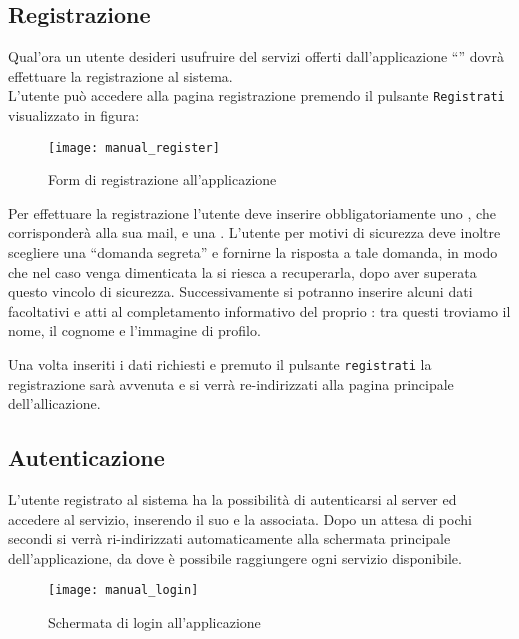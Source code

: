 \subsection{Registrazione}
Qual'ora un utente desideri usufruire del servizi offerti dall'applicazione ``\caName'' dovrà effettuare la registrazione al sistema.\\
L'utente può accedere alla pagina registrazione premendo il pulsante \texttt{Registrati} visualizzato in figura:

\begin{figure}[H]
  \texttt{[image: manual\_register]}
\caption{Form di registrazione all'applicazione}\label{fig:register}
\end{figure}


Per effettuare la registrazione l'utente deve inserire obbligatoriamente uno \underline{}, che corrisponderà alla sua mail, e una .
L'utente per motivi di sicurezza deve inoltre scegliere una ``domanda segreta'' e fornirne la risposta a tale domanda, in modo che nel caso venga dimenticata la  si riesca a recuperarla, dopo aver superata questo vincolo di sicurezza.
Successivamente si potranno inserire alcuni dati facoltativi e atti al completamento informativo del proprio : tra questi troviamo il nome, il cognome e l'immagine di profilo.

Una volta inseriti i dati richiesti e premuto il pulsante \texttt{registrati} la registrazione sarà avvenuta e si verrà re-indirizzati alla pagina principale dell'allicazione.

\subsection{Autenticazione}
L'utente registrato al sistema ha la possibilità di autenticarsi al server \caName{} ed accedere al servizio, inserendo il suo  e la  associata.
Dopo un attesa di pochi secondi si verrà ri-indirizzati automaticamente alla schermata principale dell'applicazione, da dove è possibile raggiungere ogni servizio disponibile.

\begin{figure}[H]
  \texttt{[image: manual\_login]}
\caption{Schermata di login all'applicazione}\label{fig:login}
\end{figure}

